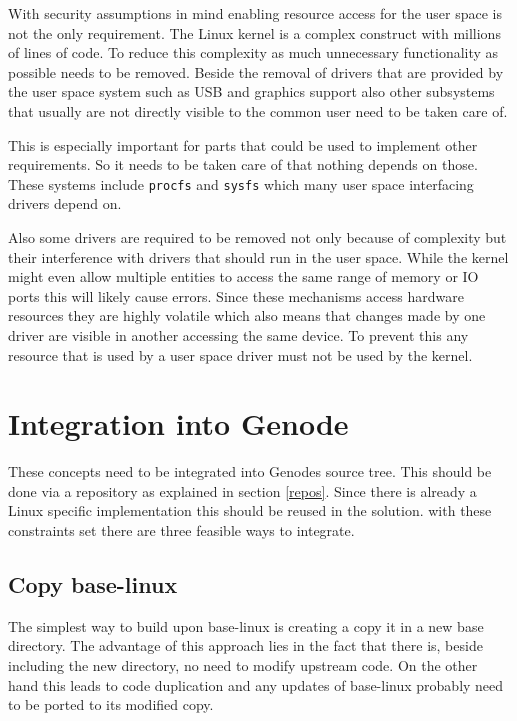 \documentclass[
a4paper,
12pt,
notitlepage,
parskip=half,
DIV=11,
]{scrbook}
\begin{document}
		With security assumptions in mind enabling resource access for the user space is not the only requirement.
		The Linux kernel is a complex construct with millions of lines of code.
		To reduce this complexity as much unnecessary functionality as possible needs to be removed.
		Beside the removal of drivers that are provided by the user space system such as USB and graphics support also other subsystems that usually are not directly visible to the common user need to be taken care of.
		
		This is especially important for parts that could be used to implement other requirements.
		So it needs to be taken care of that nothing depends on those.
		These systems include \texttt{procfs} and \texttt{sysfs} which many user space interfacing drivers depend on. \citep{sysfs} \citep{procfs}
		
		Also some drivers are required to be removed not only because of complexity but their interference with drivers that should run in the user space.
		While the kernel might even allow multiple entities to access the same range of memory or IO ports this will likely cause errors.
		Since these mechanisms access hardware resources they are highly volatile which also means that changes made by one driver are visible in another accessing the same device.
		To prevent this any resource that is used by a user space driver must not be used by the kernel.
		
		\section{Integration into Genode}
		
		These concepts need to be integrated into Genodes source tree.
		This should be done via a repository as explained in section \ref{repos}.
		Since there is already a Linux specific implementation this should be reused in the solution.
		with these constraints set there are three feasible ways to integrate.
		
		\subsection{Copy base-linux}
		The simplest way to build upon base-linux is creating a copy it in a new base directory.
		The advantage of this approach lies in the fact that there is, beside including the new directory, no need to modify upstream code.
		On the other hand this leads to code duplication and any updates of base-linux probably need to be ported to its modified copy.
		
\end{document}
